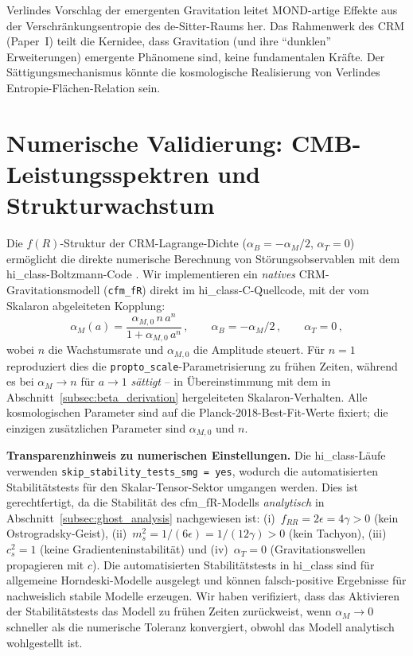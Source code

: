 \documentclass[11pt,a4paper]{article}
\begin{document}
Verlindes Vorschlag der emergenten Gravitation \cite{Verlinde2017} leitet MOND-artige Effekte aus der Verschr\"ankungsentropie des de-Sitter-Raums her. Das Rahmenwerk des CRM (Paper~I) teilt die Kernidee, dass Gravitation (und ihre "`dunklen"' Erweiterungen) emergente Ph\"anomene sind, keine fundamentalen Kr\"afte. Der S\"attigungsmechanismus k\"onnte die kosmologische Realisierung von Verlindes Entropie-Fl\"achen-Relation sein.


\section{Numerische Validierung: CMB-Leistungsspektren und Strukturwachstum}
\label{sec:numerical}

Die $f(R)$-Struktur der CRM-Lagrange-Dichte ($\alpha_B = -\alpha_M/2$, $\alpha_T = 0$) erm\"oglicht die direkte numerische Berechnung von St\"orungsobservablen mit dem hi\_class-Boltzmann-Code \cite{Zumalacarregui2017}. Wir implementieren ein \textit{natives} CRM-Gravitationsmodell (\texttt{cfm\_fR}) direkt im hi\_class-C-Quellcode, mit der vom Skalaron abgeleiteten Kopplung:
\begin{equation}
\alpha_M(a) = \frac{\alpha_{M,0}\,n\,a^n}{1 + \alpha_{M,0}\,a^n}\,, \qquad \alpha_B = -\alpha_M/2\,, \qquad \alpha_T = 0\,,
\label{eq:cfm_fR_alpha}
\end{equation}
wobei $n$ die Wachstumsrate und $\alpha_{M,0}$ die Amplitude steuert. F\"ur $n = 1$ reproduziert dies die \texttt{propto\_scale}-Parametrisierung zu fr\"uhen Zeiten, w\"ahrend es bei $\alpha_M \to n$ f\"ur $a \to 1$ \textit{s\"attigt} -- in \"Ubereinstimmung mit dem in Abschnitt~\ref{subsec:beta_derivation} hergeleiteten Skalaron-Verhalten. Alle kosmologischen Parameter sind auf die Planck-2018-Best-Fit-Werte fixiert; die einzigen zus\"atzlichen Parameter sind $\alpha_{M,0}$ und $n$.

\textbf{Transparenzhinweis zu numerischen Einstellungen.} Die hi\_class-L\"aufe verwenden \texttt{skip\_stability\_tests\_smg = yes}, wodurch die automatisierten Stabilit\"atstests f\"ur den Skalar-Tensor-Sektor umgangen werden. Dies ist gerechtfertigt, da die Stabilit\"at des cfm\_fR-Modells \textit{analytisch} in Abschnitt~\ref{subsec:ghost_analysis} nachgewiesen ist: (i)~$f_{RR} = 2\epsilon = 4\gamma > 0$ (kein Ostrogradsky-Geist), (ii)~$m_s^2 = 1/(6\epsilon) = 1/(12\gamma) > 0$ (kein Tachyon), (iii)~$c_s^2 = 1$ (keine Gradienteninstabilit\"at) und (iv)~$\alpha_T = 0$ (Gravitationswellen propagieren mit $c$). Die automatisierten Stabilit\"atstests in hi\_class sind f\"ur allgemeine Horndeski-Modelle ausgelegt und k\"onnen falsch-positive Ergebnisse f\"ur nachweislich stabile Modelle erzeugen. Wir haben verifiziert, dass das Aktivieren der Stabilit\"atstests das Modell zu fr\"uhen Zeiten zur\"uckweist, wenn $\alpha_M \to 0$ schneller als die numerische Toleranz konvergiert, obwohl das Modell analytisch wohlgestellt ist.
\end{document}

